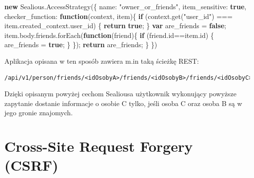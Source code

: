 \documentclass[12pt,polish,a4paper,]{report}
\newenvironment{Shaded}{}{}
\newcommand{\KeywordTok}[1]{\textcolor[rgb]{0.00,0.44,0.13}{\textbf{{#1}}}}
\newcommand{\DataTypeTok}[1]{\textcolor[rgb]{0.56,0.13,0.00}{{#1}}}
\newcommand{\StringTok}[1]{\textcolor[rgb]{0.25,0.44,0.63}{{#1}}}
\newcommand{\VariableTok}[1]{\textcolor[rgb]{0.10,0.09,0.49}{{#1}}}
\newcommand{\ControlFlowTok}[1]{\textcolor[rgb]{0.00,0.44,0.13}{\textbf{{#1}}}}
\newcommand{\OperatorTok}[1]{\textcolor[rgb]{0.40,0.40,0.40}{{#1}}}
\newcommand{\AttributeTok}[1]{\textcolor[rgb]{0.49,0.56,0.16}{{#1}}}
\newcommand{\NormalTok}[1]{{#1}}
\begin{document}
\begin{enumerate}
\begin{Shaded}
\begin{Highlighting}[]
\KeywordTok{new} \VariableTok{Sealious}\NormalTok{.}\AttributeTok{AccessStrategy}\NormalTok{(}\OperatorTok{\{}
    \DataTypeTok{name}\OperatorTok{:} \StringTok{"owner_or_friends"}\OperatorTok{,}
    \DataTypeTok{item_sensitive}\OperatorTok{:} \KeywordTok{true}\OperatorTok{,}
    \DataTypeTok{checker_function}\OperatorTok{:} \KeywordTok{function}\NormalTok{(context}\OperatorTok{,} \NormalTok{item)}\OperatorTok{\{}
        \ControlFlowTok{if} \NormalTok{(}\VariableTok{context}\NormalTok{.}\AttributeTok{get}\NormalTok{(}\StringTok{"user_id"}\NormalTok{) }\OperatorTok{===} \VariableTok{item}\NormalTok{.}\VariableTok{created_context}\NormalTok{.}\AttributeTok{user_id}\NormalTok{) }\OperatorTok{\{}
            \ControlFlowTok{return} \KeywordTok{true}\OperatorTok{;}
        \OperatorTok{\}}
        \KeywordTok{var} \NormalTok{are_friends }\OperatorTok{=} \KeywordTok{false}\OperatorTok{;}
        \VariableTok{item}\NormalTok{.}\VariableTok{body}\NormalTok{.}\VariableTok{friends}\NormalTok{.}\AttributeTok{forEach}\NormalTok{(}\KeywordTok{function}\NormalTok{(friend)}\OperatorTok{\{}
            \ControlFlowTok{if} \NormalTok{(}\VariableTok{friend}\NormalTok{.}\AttributeTok{id}\OperatorTok{==}\VariableTok{item}\NormalTok{.}\AttributeTok{id}\NormalTok{) }\OperatorTok{\{}
                \NormalTok{are_friends }\OperatorTok{=} \KeywordTok{true}\OperatorTok{;}
            \OperatorTok{\}}
        \OperatorTok{\}}\NormalTok{)}\OperatorTok{;}
        \ControlFlowTok{return} \NormalTok{are_friends}\OperatorTok{;}
    \OperatorTok{\}}
\OperatorTok{\}}\NormalTok{)}
\end{Highlighting}
\end{Shaded}

  Aplikacja opisana w ten sposób zawiera m.in taką ścieżkę REST:

\begin{verbatim}
/api/v1/person/friends/<idOsobyA>/friends/<idOsobyB>/friends/<idOsobyC>
\end{verbatim}

  Dzięki opisanym powyżej cechom Sealiousa użytkownik wykonujący
  powyższe zapytanie dostanie informacje o osobie C tylko, jeśli osoba C
  oraz osoba B są w jego gronie znajomych.
\end{enumerate}

\chapter{Cross-Site Request Forgery
(CSRF)}\label{cross-site-request-forgery-csrf}
\end{document}
